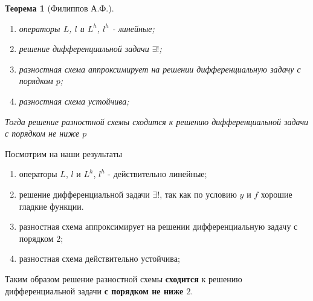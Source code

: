 \documentclass[12pt]{article}
\newtheorem*{theorem}{Теорема}
\begin{document}
\begin{enumerate}[I.]
\begin{theorem}[Филиппов А.Ф.]
\begin{enumerate}
                \item операторы $L$, $l$ и $L^h$, $l^h$ - линейные;
                \item решение дифференциальной задачи $\exists!$;
                \item разностная схема аппроксимирует на решении дифференциальную задачу с порядком $p$;
                \item разностная схема устойчива;
            \end{enumerate}
            Тогда решение разностной схемы сходится к решению дифференциальной задачи с порядком не ниже $p$
        \end{theorem}
        Посмотрим на наши результаты
        \begin{enumerate}
            \item операторы $L$, $l$ и $L^h$, $l^h$ - действительно линейные;
            \item решение дифференциальной задачи $\exists!$, так как по условию $y$ и $f$ хорошие гладкие функции.
            \item разностная схема аппроксимирует на решении дифференциальную задачу с порядком $2$;
            \item разностная схема действительно устойчива;
        \end{enumerate}
        Таким образом решение разностной схемы \textbf{сходится} к решению дифференциальной задачи \textbf{с порядком не ниже $2$}.

        \newpage


\end{enumerate}
\end{document}
